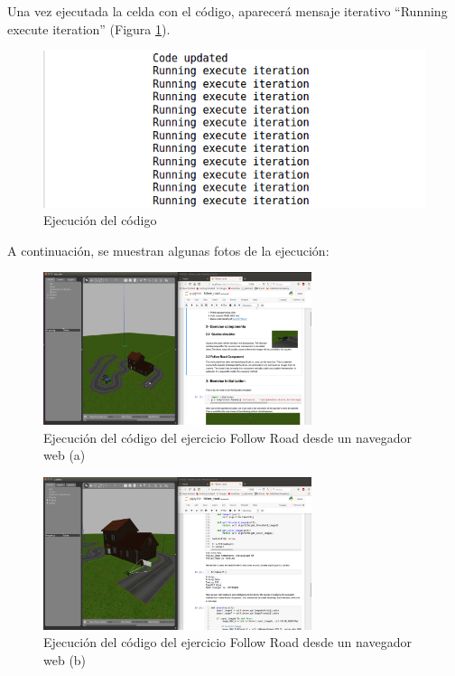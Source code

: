 Una vez ejecutada la celda con el código, aparecerá mensaje iterativo ``Running execute iteration'' (Figura \ref{fig.ecjfr}).

\begin{figure}[H]
  \begin{center}
    \includegraphics[width=.7\textwidth]{figures/ejec_cod_jup_fr.png}
		\caption{Ejecución del código}
		\label{fig.ecjfr}
		\end{center}
\end{figure}

A continuación, se muestran algunas fotos de la ejecución:

\begin{figure}[H]
  \begin{center}
    \includegraphics[width=0.7\textwidth]{figures/ejec_1_jup_fr.png}
		\caption{Ejecución del código del ejercicio Follow Road desde un navegador web (a)}
		\label{fig.ecjfr1}
		\end{center}
\end{figure}

\begin{figure}[H]
  \begin{center}
    \includegraphics[width=0.7\textwidth]{figures/ejec_2_jup_fr.png}
		\caption{Ejecución del código del ejercicio Follow Road desde un navegador web (b)}
		\label{fig.ecjfr2}
		\end{center}
\end{figure}

